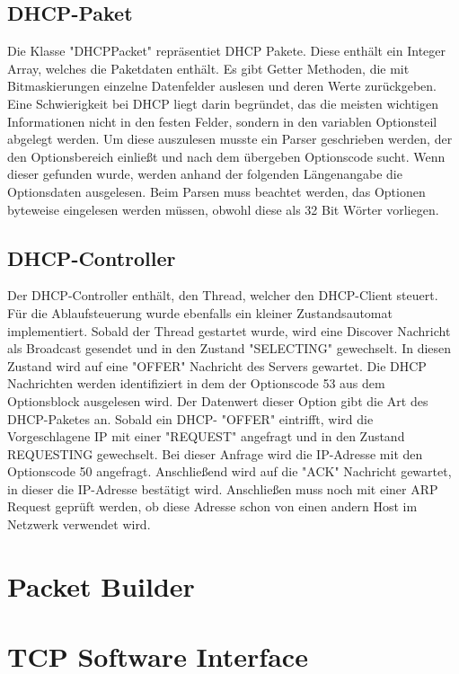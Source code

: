 \subsection{DHCP-Paket}
Die Klasse "DHCPPacket" repräsentiet DHCP Pakete. Diese enthält ein Integer Array, welches die Paketdaten enthält. Es gibt Getter Methoden, die mit Bitmaskierungen einzelne Datenfelder auslesen und deren Werte zurückgeben. Eine Schwierigkeit bei DHCP liegt darin begründet, das die meisten wichtigen Informationen nicht in den festen Felder, sondern in den variablen Optionsteil abgelegt werden. Um diese auszulesen musste ein Parser geschrieben werden, der den Optionsbereich einließt und nach dem übergeben Optionscode sucht. Wenn dieser gefunden wurde, werden anhand der folgenden Längenangabe die Optionsdaten ausgelesen. Beim Parsen muss beachtet werden, das Optionen byteweise eingelesen werden müssen, obwohl diese als 32 Bit Wörter vorliegen. 

\subsection{DHCP-Controller}

Der DHCP-Controller enthält, den Thread, welcher den DHCP-Client steuert. Für die Ablaufsteuerung wurde ebenfalls ein kleiner Zustandsautomat implementiert. Sobald der Thread gestartet wurde, wird eine Discover Nachricht als Broadcast gesendet und in den Zustand "SELECTING" gewechselt. In diesen Zustand wird auf eine "OFFER" Nachricht des Servers gewartet. Die DHCP Nachrichten werden identifiziert in dem der Optionscode 53 aus dem Optionsblock ausgelesen wird. Der Datenwert dieser Option gibt die Art des DHCP-Paketes an. Sobald ein DHCP- {}"OFFER"{} eintrifft, wird die Vorgeschlagene IP mit einer "REQUEST" angefragt und in den Zustand REQUESTING gewechselt. Bei dieser Anfrage wird die IP-Adresse mit den Optionscode 50 angefragt. Anschließend wird auf die "ACK" Nachricht gewartet, in dieser die IP-Adresse bestätigt wird. Anschließen muss noch mit einer ARP Request geprüft werden, ob diese Adresse schon von einen andern Host im Netzwerk verwendet wird. 

\section{Packet Builder}

\section{TCP Software Interface}

